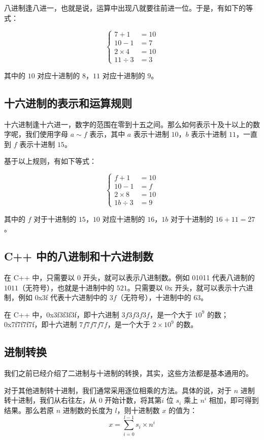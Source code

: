 八进制逢八进一，也就是说，运算中出现八就要往前进一位。于是，有如下的等式：

\[
\begin{cases}
7 + 1 &= 10\\
10 - 1 &= 7\\
2 \times 4 &= 10\\
11 \div 3 &= 3
\end{cases}
\]

其中的 $10$ 对应十进制的 $8$，$11$ 对应十进制的 $9$。

\subsection{十六进制的表示和运算规则}

十六进制逢十六进一，数字的范围在零到十五之间。那么如何表示十及十以上的数字呢，我们使用字母 $a \sim f $ 表示，其中 $a$ 表示十进制 $10$，$b$ 表示十进制 $11$，一直到 $f$ 表示十进制 $15$。

基于以上规则，有如下等式：

\[
\begin{cases}
f + 1 &= 10\\
10 - 1 &= f\\
2 \times 8 &= 10\\
1b \div 3 &= 9
\end{cases}
\]

其中的 $f$ 对于十进制的 $15$，$10$ 对应十进制的 $16$，$1b$ 对于十进制的 $16 + 11 = 27$。

\subsection{C++ 中的八进制和十六进制数}

在 C++ 中，只需要以 0 开头，就可以表示八进制数。例如 01011 代表八进制的 $1011$（无符号），也就是十进制中的 $521$。只需要以 0x 开头，就可以表示十六进制，例如 0x3f 代表十六进制中的 $3f$（无符号），十进制中的 $63$。

在 C++ 中，0x3f3f3f3f，即十六进制 $3f3f3f3f$，是一个大于 $10^9$ 的数；0x7f7f7f7f，即十六进制 $7f7f7f7f$，是一个大于 $2 \times 10^9$ 的数。

\subsection{进制转换}

我们之前已经介绍了二进制与十进制的转换，其实，这些方法都是基本通用的。

对于其他进制转十进制，我们通常采用逐位相乘的方法。具体的说，对于 $n$ 进制转十进制，我们从右往左，从 $0$ 开始计数，将其第$i$ 位 $s_i$ 乘上 $n^i$ 相加，即可得到结果。那么若原 $n$ 进制数的长度为 $l$，则十进制数 $x$ 的值为：
\[
x = \sum_{i=0}^{l-1} s_i \times n^i
\]

